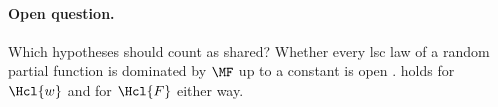 \paragraph{Open question.}\label{q:absorb:shared}
Which hypotheses should count as shared? Whether every lsc law of a random partial function is dominated by $\MF$ up to a constant is open \citep{claudeSFI2026fundamentals}.  holds for $\Hcl{w}$ and for $\Hcl{F}$ either way.
